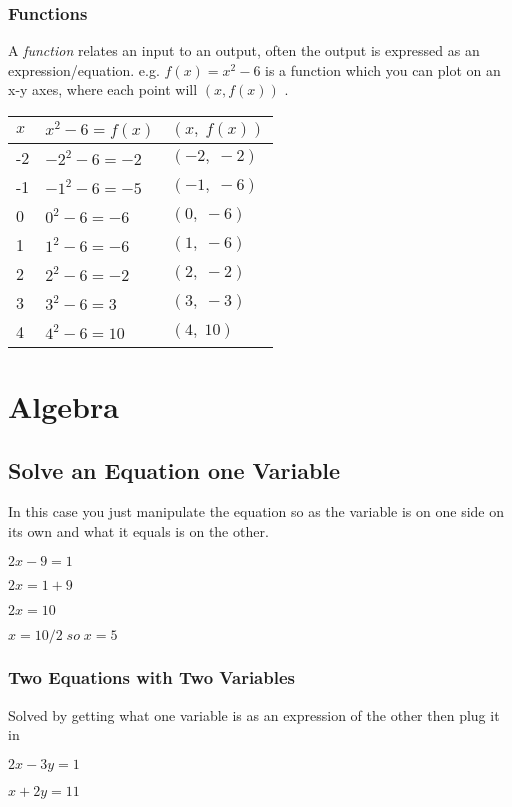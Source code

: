 \documentclass{article}
\begin{document}
\subsubsection{Functions}
A \textit{function} relates an input to an output, often the output is expressed as an expression/equation.
e.g. $f(x) = x^2 - 6 $ is a function which you can plot on an x-y axes, where each point will $(x,f(x))$ . 



\begin{tabular}{l|l|l}
$x$ & $ x^{2} - 6 = f(x)$& $(x,\;f(x))$  \\
\hline
-2 & $-2^{2} -6 = -2$ & $(-2,\;-2)$  \\
-1 & $-1^{2} -6 = -5$ & $(-1,\;-6)$  \\
0 & $0^{2} -6 = -6$ & $(0,\;-6)$  \\
1 & $1^{2} -6 = -6$ & $(1,\;-6)$  \\
2 & $2^{2} -6 = -2$ & $(2,\;-2)$  \\
3 & $3^{2} -6 = 3$ & $(3,\;-3)$  \\
4 & $4^{2} -6 = 10$ & $(4,\;10)$ \\

\end{tabular}



\newpage
\section{Algebra}
\subsection{Solve an Equation one Variable}
In this case you just manipulate the equation so as the variable is on one side on its own and what it equals is on the other.

$2x - 9 = 1$

$2x = 1 + 9 $

$2x = 10 $

$x = 10 /2  \;so \; x = 5$

\subsubsection{Two Equations with Two Variables}
Solved by getting what one variable is as an expression of the other then plug it in

$2x -3y = 1 $  
       
$x + 2y = 11 $	     
\end{document}
